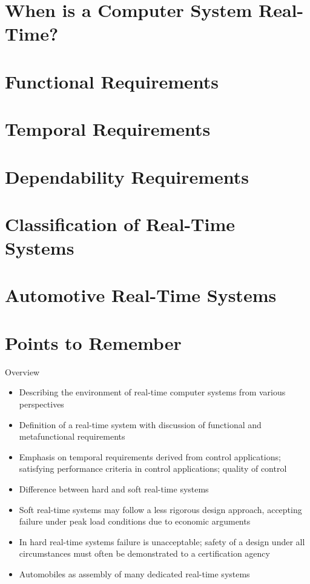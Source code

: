 %
%

\section{When is a Computer System Real-Time?}
\section{Functional Requirements}
\section{Temporal Requirements}
\section{Dependability Requirements}
\section{Classification of Real-Time Systems}
\section{Automotive Real-Time Systems}
\section{Points to Remember}

\begin{frame}{Overview}
\begin{itemize}
\item
  Describing the environment of real-time computer systems from various
  perspectives
\item
  Definition of a real-time system with discussion of functional and
  metafunctional requirements
\item
Emphasis on temporal requirements derived from control applications; satisfying performance criteria in control applications; quality of control
\item
Difference between hard and soft real-time systems
\item
Soft real-time systems may follow a less rigorous design approach, accepting failure under peak load conditions due to economic arguments
\item
In hard real-time systems failure is unacceptable; safety of a design under all circumstances must often be demonstrated to a certification agency
\item
  Automobiles as assembly of many dedicated real-time systems
\end{itemize}
\end{frame}


